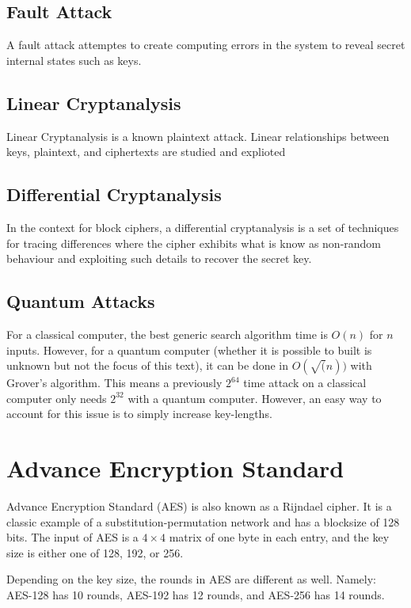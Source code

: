 \documentclass{article}
\begin{document}
\begin{multicols}{2}
\subsection{Fault Attack}

A fault attack attemptes to create computing errors in the system to reveal secret internal states such as keys.

\subsection{Linear Cryptanalysis}

Linear Cryptanalysis is a known plaintext attack. Linear relationships between keys, plaintext, and ciphertexts are studied and explioted

\subsection{Differential Cryptanalysis}

In the context for block ciphers, a differential cryptanalysis is a set of techniques for tracing differences where the cipher exhibits what is know as non-random behaviour and exploiting such details to recover the secret key.

\subsection{Quantum Attacks}

For a classical computer, the best generic search algorithm time is $O(n)$ for $n$ inputs. However, for a quantum computer (whether it is possible to built is unknown but not the focus of this text), it can be done in $O(\sqrt(n))$ with Grover's algorithm. This means a previously $2^{64}$ time attack on a classical computer only needs $2^{32}$ with a quantum computer. However, an easy way to 
account for this issue is to simply increase key-lengths.

\section{Advance Encryption Standard}

Advance Encryption Standard (AES) is also known as a Rijndael cipher. It is a classic example of a substitution-permutation network and has a blocksize of 128 bits. The input of AES is a $4 \times 4$ matrix of one byte in each entry, and the key size is either one of 128, 192, or 256. 

Depending on the key size, the rounds in AES are different as well. Namely: AES-128 has 10 rounds, AES-192 has 12 rounds, and AES-256 has 14 rounds. 


\end{multicols}
\end{document}
